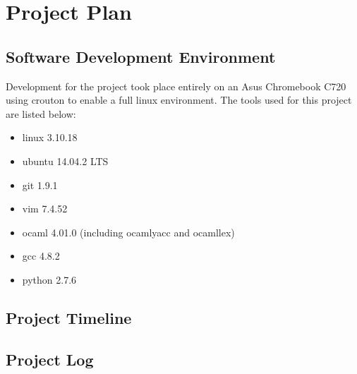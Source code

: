 \section{Project Plan}

\subsection{Software Development Environment}

Development for the project took place entirely on an Asus Chromebook C720 using crouton
to enable a full linux environment. The tools used for this project are listed below:

\begin{itemize}
\item linux 3.10.18
\item ubuntu 14.04.2 LTS
\item git 1.9.1
\item vim 7.4.52
\item ocaml 4.01.0 (including ocamlyacc and ocamllex)
\item gcc 4.8.2
\item python 2.7.6
\end{itemize}

\subsection{Project Timeline}


\subsection{Project Log}
